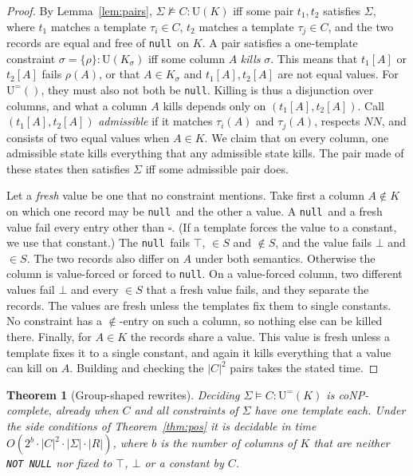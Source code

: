 \documentclass[conference]{IEEEtran}
\newtheorem{theorem}{Theorem}
\theoremstyle{definition}
\newcommand{\sql}[1]{\texttt{#1}}
\newcommand{\nul}{\texttt{null}}
\newcommand{\NN}{\mathit{NN}}
\newcommand{\Sig}{\Sigma}
\newcommand{\U}[1]{\mathrm{U}(#1)}
\newcommand{\Ueq}[1]{\mathrm{U}^{=}(#1)}
\newcommand{\any}{\square}
\begin{document}
\begin{proof}
By Lemma~\ref{lem:pairs}, $\Sig\not\models C:\U{K}$ iff some pair $t_1,t_2$ satisfies $\Sig$, where $t_1$ matches a
template $\tau_i\in C$, $t_2$ matches a template $\tau_j\in C$, and the two records are equal and free of \nul\ on $K$. A
pair satisfies a one-template constraint $\sigma=\{\rho\}:\U{K_\sigma}$ iff some column $A$ \emph{kills} $\sigma$. This
means that $t_1[A]$ or $t_2[A]$ fails $\rho(A)$, or that $A\in K_\sigma$ and $t_1[A],t_2[A]$ are not equal values. For
$\Ueq{}$, they must also not both be \nul. Killing is thus a disjunction over columns, and what a column $A$ kills
depends only on $(t_1[A],t_2[A])$. Call $(t_1[A],t_2[A])$ \emph{admissible} if it matches $\tau_i(A)$ and $\tau_j(A)$,
respects $\NN$, and consists of two equal values when $A\in K$. We claim that on every column, one admissible state
kills everything that any admissible state kills. The pair made of these states then satisfies $\Sig$ iff some
admissible pair does.

Let a \emph{fresh} value be one that no constraint mentions. Take first a column $A\notin K$ on which one record may be
\nul\ and the other a value. A \nul\ and a fresh value fail every entry other than $\any$. (If a template forces the
value to a constant, we use that constant.) The \nul\ fails $\top$, ${\in}S$ and ${\notin}S$, and the value fails $\bot$
and ${\in}S$. The two records also differ on $A$ under both semantics. Otherwise the column is value-forced or forced to
\nul. On a value-forced column, two different values fail $\bot$ and every ${\in}S$ that a fresh value fails, and they
separate the records. The values are fresh unless the templates fix them to single constants. No constraint has a
${\notin}$-entry on such a column, so nothing else can be killed there. Finally, for $A\in K$ the records share a value.
This value is fresh unless a template fixes it to a single constant, and again it kills everything that a value can kill
on $A$. Building and checking the $|C|^2$ pairs takes the stated time.
\end{proof}

\begin{theorem}[Group-shaped rewrites]\label{thm:dom}
Deciding $\Sig\models C:\Ueq{K}$ is coNP-complete, already when $C$ and all constraints of $\Sig$
have one template each. Under the side conditions of Theorem~\ref{thm:pos} it is decidable in time
$O(2^b\cdot|C|^2\cdot|\Sig|\cdot|R|)$, where $b$ is the number of columns of $K$ that are neither
\sql{NOT NULL} nor fixed to $\top$, $\bot$ or a constant by $C$.
\end{theorem}
\end{document}

